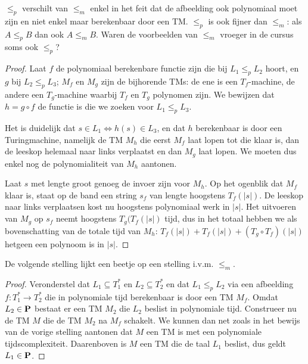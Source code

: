 $\leq_p$ verschilt van $\leq_m$ enkel in het feit dat de afbeelding
ook polynomiaal moet zijn en niet enkel maar berekenbaar door een TM.
$\leq_p$ is ook fijner dan $\leq_m$: als $A \leq_p B$ dan ook $A \leq_m B$.
Waren de voorbeelden van $\leq_m$ vroeger in de cursus soms ook $\leq_p$?



\begin{proof}   
Laat $f$ de polynomiaal berekenbare functie zijn die bij $L_1 \leq_p L_2$
hoort, en $g$ bij $L_2 \leq_p L_3$; $M_f$ en $M_g$ zijn de bijhorende
TMs: de ene is een $T_f$-machine, de andere een $T_g$-machine
waarbij $T_f$ en $T_g$ polynomen zijn. We bewijzen dat
%
$h = g\circ f$ de functie is die we zoeken voor $L_1 \leq_p L_3$.

Het is duidelijk dat $s \in L_1 \Leftrightarrow h(s) \in L_3$, en dat
$h$ berekenbaar is door een Turingmachine, namelijk de TM $M_h$ die
eerst $M_f$ laat lopen tot die klaar is, dan de leeskop helemaal naar
links verplaatst en dan $M_g$ laat lopen. We moeten dus enkel nog de
polynomialiteit van $M_h$ aantonen.

Laat $s$ met lengte groot genoeg de invoer zijn voor $M_h$. Op het
ogenblik dat $M_f$ klaar is, staat op de band een string $s_f$ van
lengte hoogstens $T_f(|s|)$. De leeskop naar links verplaatsen kost nu
hoogstens polynomiaal werk in $|s|$. Het uitvoeren van $M_g$ op $s_f$
neemt hoogstens $T_g(T_f(|s|)$ tijd, dus in het totaal hebben we als
bovenschatting van de totale tijd van $M_h$:
%
$T_f(|s|) + T_f(|s|) + (T_g \circ T_f)(|s|)$ hetgeen een polynoom is
in $|s|$.
\end{proof}


De volgende stelling lijkt een beetje op een stelling i.v.m. $\leq_m$.


\begin{proof}  Veronderstel dat $L_1\subseteq T_1^*$ en
$L_2\subseteq T_2^*$ en dat  $L_1 \leq_p  L_2$ via een afbeelding
$f:T_1^*\rightarrow T_2^*$ die in polynomiale tijd berekenbaar is
door een TM $M_f$. Omdat $L_2\in \P$ bestaat er een TM $M_2$ die $L_2$
beslist in polynomiale tijd. Construeer nu de TM $M$ die de TM $M_2$
na $M_f$ schakelt. We kunnen dan net zoals in het bewijs van de vorige
stelling aantonen dat $M$ een TM is met een polynomiale
tijdscomplexiteit.  Daarenboven is $M$ een TM die de taal $L_1$
beslist, dus geldt $L_1\in \P$.
\end{proof}



